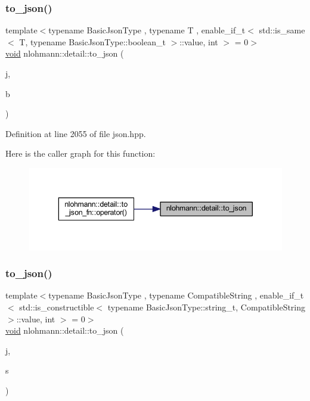 \subsubsection{\texorpdfstring{to\_json()}{to\_json()}\hspace{0.1cm}{\footnotesize\ttfamily [1/17]}}
{\footnotesize\ttfamily template$<$typename Basic\+Json\+Type , typename T , enable\+\_\+if\+\_\+t$<$ std\+::is\+\_\+same$<$ T, typename Basic\+Json\+Type\+::boolean\+\_\+t $>$\+::value, int $>$  = 0$>$ \\
\mbox{\hyperlink{namespacenlohmann_1_1detail_a59fca69799f6b9e366710cb9043aa77d}{void}} nlohmann\+::detail\+::to\+\_\+json (\begin{DoxyParamCaption}\item[{Basic\+Json\+Type \&}]{j,  }\item[{T}]{b }\end{DoxyParamCaption})\hspace{0.3cm}{\ttfamily [noexcept]}}



Definition at line 2055 of file json.\+hpp.

Here is the caller graph for this function\+:
\nopagebreak
\begin{figure}[H]
\begin{center}
\leavevmode
\includegraphics[width=343pt]{namespacenlohmann_1_1detail_a1a804b98cbe89b7e44b698f2ca860490_icgraph}
\end{center}
\end{figure}
\mbox{\label{namespacenlohmann_1_1detail_a7356ed05cdbbb080cee80e1211e1c6c9}} 
\subsubsection{\texorpdfstring{to\_json()}{to\_json()}\hspace{0.1cm}{\footnotesize\ttfamily [2/17]}}
{\footnotesize\ttfamily template$<$typename Basic\+Json\+Type , typename Compatible\+String , enable\+\_\+if\+\_\+t$<$ std\+::is\+\_\+constructible$<$ typename Basic\+Json\+Type\+::string\+\_\+t, Compatible\+String $>$\+::value, int $>$  = 0$>$ \\
\mbox{\hyperlink{namespacenlohmann_1_1detail_a59fca69799f6b9e366710cb9043aa77d}{void}} nlohmann\+::detail\+::to\+\_\+json (\begin{DoxyParamCaption}\item[{Basic\+Json\+Type \&}]{j,  }\item[{const Compatible\+String \&}]{s }\end{DoxyParamCaption})}



